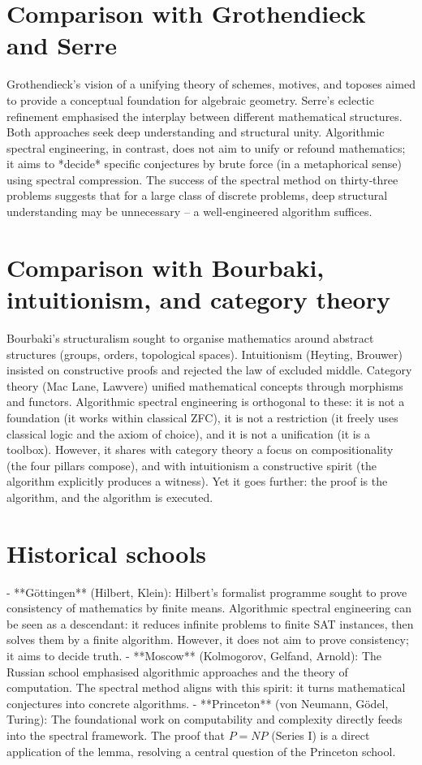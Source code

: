 \documentclass[11pt,a4paper]{article}
\begin{document}
\section{Comparison with Grothendieck and Serre}

Grothendieck's vision of a unifying theory of schemes, motives, and toposes aimed to provide a conceptual foundation for algebraic geometry. Serre's eclectic refinement emphasised the interplay between different mathematical structures. Both approaches seek deep understanding and structural unity. Algorithmic spectral engineering, in contrast, does not aim to unify or refound mathematics; it aims to *decide* specific conjectures by brute force (in a metaphorical sense) using spectral compression. The success of the spectral method on thirty‑three problems suggests that for a large class of discrete problems, deep structural understanding may be unnecessary – a well‑engineered algorithm suffices.

\section{Comparison with Bourbaki, intuitionism, and category theory}

Bourbaki's structuralism sought to organise mathematics around abstract structures (groups, orders, topological spaces). Intuitionism (Heyting, Brouwer) insisted on constructive proofs and rejected the law of excluded middle. Category theory (Mac Lane, Lawvere) unified mathematical concepts through morphisms and functors. Algorithmic spectral engineering is orthogonal to these: it is not a foundation (it works within classical ZFC), it is not a restriction (it freely uses classical logic and the axiom of choice), and it is not a unification (it is a toolbox). However, it shares with category theory a focus on compositionality (the four pillars compose), and with intuitionism a constructive spirit (the algorithm explicitly produces a witness). Yet it goes further: the proof is the algorithm, and the algorithm is executed.

\section{Historical schools}

- **Göttingen** (Hilbert, Klein): Hilbert's formalist programme sought to prove consistency of mathematics by finite means. Algorithmic spectral engineering can be seen as a descendant: it reduces infinite problems to finite SAT instances, then solves them by a finite algorithm. However, it does not aim to prove consistency; it aims to decide truth.
- **Moscow** (Kolmogorov, Gelfand, Arnold): The Russian school emphasised algorithmic approaches and the theory of computation. The spectral method aligns with this spirit: it turns mathematical conjectures into concrete algorithms.
- **Princeton** (von Neumann, Gödel, Turing): The foundational work on computability and complexity directly feeds into the spectral framework. The proof that \(P = NP\) (Series I) is a direct application of the lemma, resolving a central question of the Princeton school.
\end{document}
